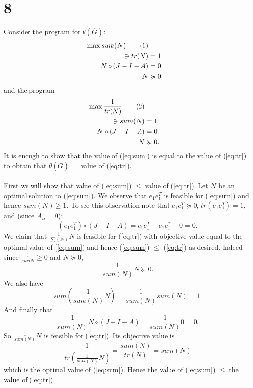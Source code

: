 \documentclass[letterpaper,12pt,oneside,onecolumn]{article}
\newcommand{\1}{\mathbbm{1}}
\newcommand\numberthis{\addtocounter{equation}{1}\tag{\theequation}}
\begin{document}
\section*{8}
\paragraph{}
Consider the program for $\theta(\overline{G})$:
\begin{align*}
\max sum(N) \label{eq:sum}\numberthis  \\
\ni tr(N) &= 1\\
N \circ (J - I - A) & =0 \\
N & \succcurlyeq 0
\end{align*}
and the program
\begin{align*}
\max \frac{1}{tr(N)} \label{eq:tr}\numberthis  \\
\ni sum(N) &= 1\\
N \circ (J - I - A) & =0 \\
N & \succcurlyeq 0.
\end{align*}
It is enough to show that the value of (\ref{eq:sum}) is equal to the value of (\ref{eq:tr}) to obtain that $\theta(\overline{G}) = $ value of (\ref{eq:tr}).
\paragraph{}
First we will show that  value of (\ref{eq:sum}) $\leq$ value of (\ref{eq:tr}). Let $N$ be an optimal solution to (\ref{eq:sum}). We observe that $e_1e_1^T$ is feasible for (\ref{eq:sum}) and hence $sum(N) \geq 1$. To see this observation note that $e_1e_1^T \succcurlyeq 0$, $tr(e_1e_1^T) = 1$, and (since $A_{ii}= 0$):
$$(e_1e_1^T) \circ (J- I - A) = e_1e_1^T - e_1e_1^T - 0 = 0.$$
We claim that $\frac{1}{\sum(N)} N$ is feasible for (\ref{eq:tr}) with objective value equal to the optimal value of (\ref{eq:sum}) and hence (\ref{eq:sum}) $\leq$ (\ref{eq:tr}) as desired. Indeed since  $\frac{1}{sum{N}} \geq 0$ and $N \succcurlyeq 0$, 
$$\frac{1}{sum(N)}N \succcurlyeq 0.$$
We also have $$sum(\frac{1}{sum(N)} N)= \frac{1}{sum(N)}sum(N) = 1.$$
And finally that
$$\frac{1}{sum(N)} N \circ (J - I - A) = \frac{1}{sum(N)} 0 = 0.$$
So $\frac{1}{sum(N)} N$ is feasible for (\ref{eq:tr}). Its objective value is
$$\frac{1}{tr(\frac{1}{sum(N)}N)} = \frac{sum(N)}{tr(N)} = sum(N)$$
which is the optimal value of (\ref{eq:sum}). Hence the value of (\ref{eq:sum}) $\leq$ the value of (\ref{eq:tr}).
\end{document}
